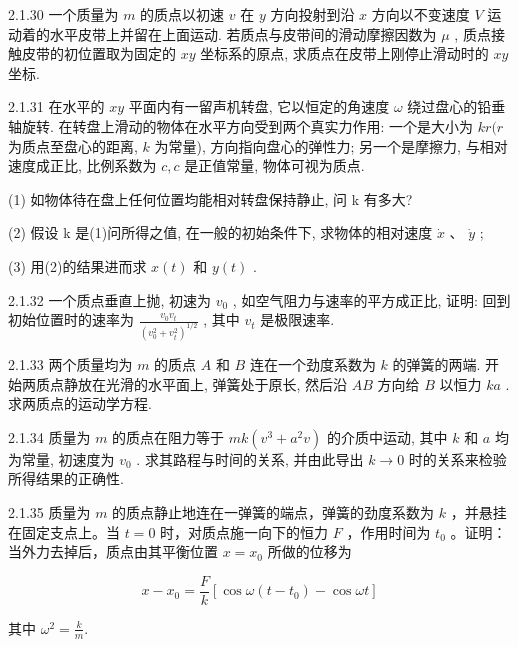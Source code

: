 \begin{problem}{2.1.30}
一个质量为 $m$ 的质点以初速 $v$ 在 $y$ 方向投射到沿 $x$ 方向以不变速度 $V$ 运动着的水平皮带上并留在上面运动. 若质点与皮带间的滑动摩擦因数为 $\mu$ , 质点接触皮带的初位置取为固定的 $xy$ 坐标系的原点, 求质点在皮带上刚停止滑动时的 $xy$ 坐标.
\end{problem}
\clearpage


\begin{problem}{2.1.31}
在水平的 $xy$ 平面内有一留声机转盘, 它以恒定的角速度 $\omega$ 绕过盘心的铅垂轴旋转. 在转盘上滑动的物体在水平方向受到两个真实力作用: 一个是大小为 $kr(r$ 为质点至盘心的距离, $k$ 为常量), 方向指向盘心的弹性力; 另一个是摩擦力, 与相对速度成正比, 比例系数为 $c, c$ 是正值常量, 物体可视为质点.

(1) 如物体待在盘上任何位置均能相对转盘保持静止, 问 k 有多大?

(2) 假设 k 是(1)问所得之值, 在一般的初始条件下, 求物体的相对速度 $\dot{x}$ 、 $\dot{y}$ ;

(3) 用(2)的结果进而求 $x(t)$ 和 $y(t)$ .
\end{problem}
\clearpage


\begin{problem}{2.1.32}
一个质点垂直上抛, 初速为 $v_{0}$ , 如空气阻力与速率的平方成正比, 证明: 回到初始位置时的速率为 $\frac{v_{0} v_{t}}{(v_{0}^{2} + v_{t}^{2})^{1/2}}$ , 其中 $v_{t}$ 是极限速率.
\end{problem}
\clearpage


\begin{problem}{2.1.33}
两个质量均为 $m$ 的质点 $A$ 和 $B$ 连在一个劲度系数为 $k$ 的弹簧的两端. 开始两质点静放在光滑的水平面上, 弹簧处于原长, 然后沿 $AB$ 方向给 $B$ 以恒力 $ka$ . 求两质点的运动学方程.
\end{problem}
\clearpage


\begin{problem}{2.1.34}
质量为 $m$ 的质点在阻力等于 $mk(v^3 + a^2 v)$ 的介质中运动, 其中 $k$ 和 $a$ 均为常量, 初速度为 $v_0$ . 求其路程与时间的关系, 并由此导出 $k \to 0$ 时的关系来检验所得结果的正确性.
\end{problem}
\clearpage


\begin{problem}{2.1.35}
质量为 $m$ 的质点静止地连在一弹簧的端点，弹簧的劲度系数为 $k$ ，并悬挂在固定支点上。当 $t = 0$ 时，对质点施一向下的恒力 $F$ ，作用时间为 $t_0$ 。证明：当外力去掉后，质点由其平衡位置 $x = x_0$ 所做的位移为

\[
x - x _ {0} = \frac {F}{k} [ \cos \omega (t - t _ {0}) - \cos \omega t ]
\]

其中 $\omega^{2}=\frac{k}{m}.$
\end{problem}
\clearpage


